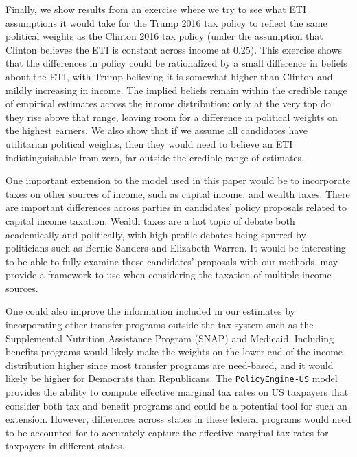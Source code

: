 \documentclass[12pt]{article}
\begin{document}
Finally, we show results from an exercise where we try to see what ETI assumptions it would take for the Trump 2016 tax policy to reflect the same political weights as the Clinton 2016 tax policy (under the assumption that Clinton believes the ETI is constant across income at 0.25).  This exercise shows that the differences in policy could be rationalized by a small difference in beliefs about the ETI, with Trump believing it is somewhat higher than Clinton and mildly increasing in income.  The implied beliefs remain within the credible range of empirical estimates across the income distribution; only at the very top do they rise above that range, leaving room for a difference in political weights on the highest earners.  We also show that if we assume all candidates have utilitarian political weights, then they would need to believe an ETI indistinguishable from zero, far outside the credible range of estimates.

One important extension to the model used in this paper would be to incorporate taxes on other sources of income, such as capital income, and wealth taxes. There are important differences across parties in candidates' policy proposals related to capital income taxation.  Wealth taxes are a hot topic of debate both academically and politically, with high profile debates being spurred by politicians such as Bernie Sanders and Elizabeth Warren. It would be interesting to be able to fully examine those candidates' proposals with our methods.  \citet{SLRSZ2022} may provide a framework to use when considering the taxation of multiple income sources.

One could also improve the information included in our estimates by incorporating other transfer programs outside the tax system such as the Supplemental Nutrition Assistance Program (SNAP) and Medicaid. Including benefits programs would likely make the weights on the lower end of the income distribution higher since most transfer programs are need-based, and it would likely be higher for Democrats than Republicans.  The \texttt{PolicyEngine-US} model provides the ability to compute effective marginal tax rates on US taxpayers that consider both tax and benefit programs and could be a potential tool for such an extension. However, differences across states in these federal programs would need to be accounted for to accurately capture the effective marginal tax rates for taxpayers in different states.



\newpage
\end{document}
